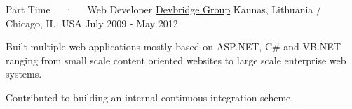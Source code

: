 \begin{cventries}
  \cventry
    {Part Time~~~·~~~Web Developer} %
    {\href{https://devbridge.com}{Devbridge Group}} %
    {Kaunas, Lithuania / Chicago, IL, USA} %
    {July 2009 - May 2012} %
    {
      \begin{cvitems} %
        \item {Built multiple web applications mostly based on ASP.NET, C\# and VB.NET ranging from small scale content oriented websites to large scale enterprise web systems.}
        \item {Contributed to building an internal continuous integration scheme.}
      \end{cvitems}
    }

\end{cventries}
